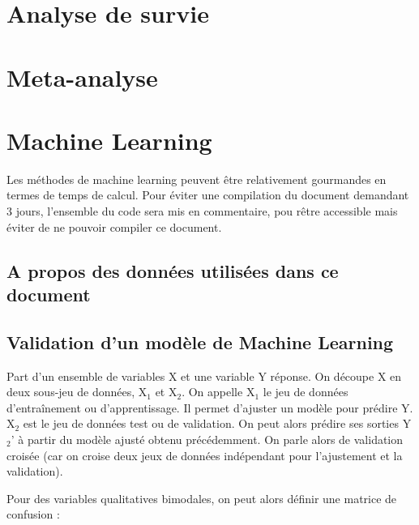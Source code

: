 \documentclass[
]{article}
\begin{document}
\pagebreak

\hypertarget{analyse-de-survie}{%
\section{Analyse de survie}\label{analyse-de-survie}}

\pagebreak

\hypertarget{meta-analyse}{%
\section{Meta-analyse}\label{meta-analyse}}

\hypertarget{machine-learning}{%
\section{Machine Learning}\label{machine-learning}}

Les méthodes de machine learning peuvent être relativement gourmandes en
termes de temps de calcul. Pour éviter une compilation du document
demandant 3 jours, l'ensemble du code sera mis en commentaire, pou rêtre
accessible mais éviter de ne pouvoir compiler ce document.

\hypertarget{a-propos-des-donnuxe9es-utilisuxe9es-dans-ce-document}{%
\subsection{A propos des données utilisées dans ce
document}\label{a-propos-des-donnuxe9es-utilisuxe9es-dans-ce-document}}

\hypertarget{validation-dun-moduxe8le-de-machine-learning}{%
\subsection{Validation d'un modèle de Machine
Learning}\label{validation-dun-moduxe8le-de-machine-learning}}

Part d'un ensemble de variables X et une variable Y réponse. On découpe
X en deux sous-jeu de données, X\(_1\) et X\(_2\). On appelle X\(_1\) le
jeu de données d'entraînement ou d'apprentissage. Il permet d'ajuster un
modèle pour prédire Y. X\(_2\) est le jeu de données test ou de
validation. On peut alors prédire ses sorties Y\(_2\)' à partir du
modèle ajusté obtenu précédemment. On parle alors de validation croisée
(car on croise deux jeux de données indépendant pour l'ajustement et la
validation).

Pour des variables qualitatives bimodales, on peut alors définir une
matrice de confusion :
\end{document}
